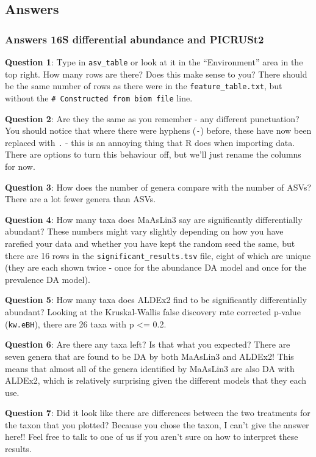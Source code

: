 \documentclass[
]{book}
\begin{document}
\subsection{Answers}\label{answers-2}

\subsubsection{Answers 16S differential abundance and PICRUSt2}\label{answers-16s-differential-abundance-and-picrust2}

\textbf{Question 1}: Type in \texttt{asv\_table} or look at it in the ``Environment'' area in the top right. How many rows are there? Does this make sense to you?
There should be the same number of rows as there were in the \texttt{feature\_table.txt}, but without the \texttt{\#\ Constructed\ from\ biom\ file} line.

\textbf{Question 2}: Are they the same as you remember - any different punctuation?
You should notice that where there were hyphens (\texttt{-}) before, these have now been replaced with \texttt{.} - this is an annoying thing that R does when importing data. There are options to turn this behaviour off, but we'll just rename the columns for now.

\textbf{Question 3}: How does the number of genera compare with the number of ASVs?
There are a lot fewer genera than ASVs.

\textbf{Question 4}: How many taxa does MaAsLin3 say are significantly differentially abundant?
These numbers might vary slightly depending on how you have rarefied your data and whether you have kept the random seed the same, but there are 16 rows in the \texttt{significant\_results.tsv} file, eight of which are unique (they are each shown twice - once for the abundance DA model and once for the prevalence DA model).

\textbf{Question 5}: How many taxa does ALDEx2 find to be significantly differentially abundant?
Looking at the Kruskal-Wallis false discovery rate corrected p-value (\texttt{kw.eBH}), there are 26 taxa with p \textless= 0.2.

\textbf{Question 6}: Are there any taxa left? Is that what you expected?
There are seven genera that are found to be DA by both MaAsLin3 and ALDEx2! This means that almost all of the genera identified by MaAsLin3 are also DA with ALDEx2, which is relatively surprising given the different models that they each use.

\textbf{Question 7}: Did it look like there are differences between the two treatments for the taxon that you plotted?
Because you chose the taxon, I can't give the answer here!! Feel free to talk to one of us if you aren't sure on how to interpret these results.
\end{document}
